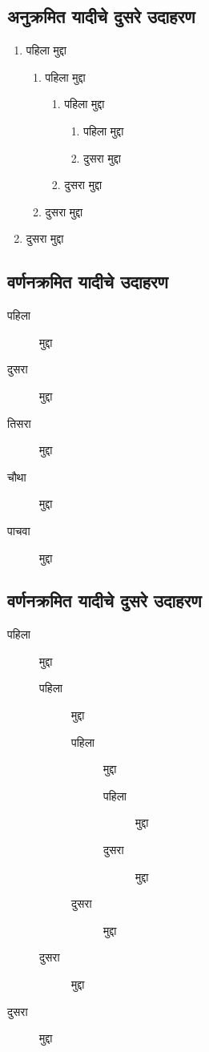 \subsection*{अनुक्रमित यादीचे दुसरे उदाहरण}
\begin{enumerate}
\item पहिला मुद्दा
\begin{enumerate}
\item पहिला मुद्दा
\begin{enumerate}
\item पहिला मुद्दा
\begin{enumerate}
\item पहिला मुद्दा
\item दुसरा मुद्दा
\end{enumerate}
\item दुसरा मुद्दा
\end{enumerate}
\item दुसरा मुद्दा
\end{enumerate}
\item दुसरा मुद्दा
\end{enumerate}
\subsection{वर्णनक्रमित यादीचे उदाहरण}
\begin{description}
\item[पहिला] मुद्दा
\item[दुसरा] मुद्दा
\item[तिसरा] मुद्दा
\item[चौथा] मुद्दा
\item[पाचवा] मुद्दा
\end{description}
\subsection*{वर्णनक्रमित यादीचे दुसरे उदाहरण}
\begin{description}
\item[पहिला] मुद्दा
\begin{description}
\item[पहिला] मुद्दा
\begin{description}
\item[पहिला] मुद्दा
\begin{description}
\item[पहिला] मुद्दा
\item[दुसरा] मुद्दा
\end{description}
\item[दुसरा] मुद्दा
\end{description}
\item[दुसरा] मुद्दा
\end{description}
\item[दुसरा] मुद्दा
\end{description}
